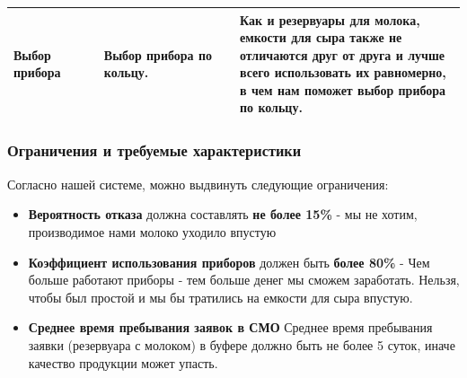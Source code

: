 \documentclass[a4paper, 14pt]{article}
\begin{document}
\begin{center}
\begin{tabular}{|p{0.2\linewidth} | p{0.3\linewidth}| p{0.5\linewidth}|}
		\hline
		Выбор прибора      & Выбор прибора по кольцу.                                                             & Как и резервуары для молока, емкости для сыра также не отличаются друг от друга и лучше всего использовать их \textbf{равномерно}, в чем нам поможет выбор прибора по кольцу.                                                                                                                                                                                                                                                                                                                                                                                                                                                                                  \\
		\hline
	\end{tabular}
\end{center}

\subsubsection{Ограничения и требуемые характеристики}

Согласно нашей системе, можно выдвинуть следующие ограничения:

\begin{itemize}
	\item \textbf{Вероятность отказа} должна составлять \textbf{не более 15\%} - мы не хотим, производимое нами молоко уходило впустую
	\item \textbf{Коэффициент использования приборов} должен быть \textbf{более 80\%} - Чем больше работают приборы - тем больше денег мы сможем заработать. Нельзя, чтобы был простой и мы бы тратились на емкости для сыра впустую.
	\item \textbf{Среднее время пребывания заявок в СМО} Среднее время пребывания заявки (резервуара с молоком) в буфере должно быть не более 5 суток, иначе качество продукции может упасть.
\end{itemize}
\end{document}
